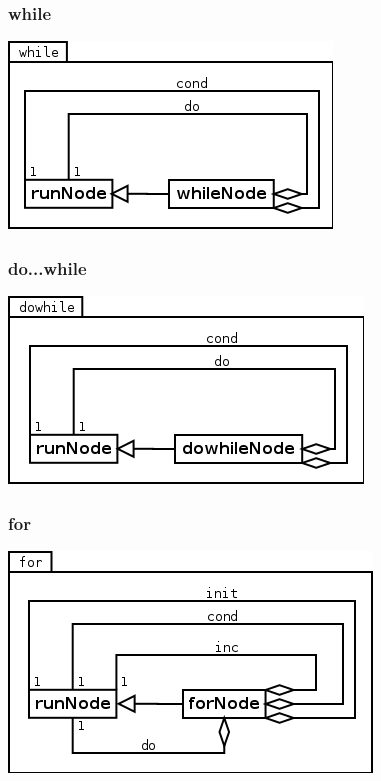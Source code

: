 \subsubsection{while}
\begin{center}
\includegraphics[scale=0.4]{while.png} \\
\end{center}


\subsubsection{do...while}
\begin{center}
\includegraphics[scale=0.4]{dowhile.png} \\
\end{center}

\subsubsection{for}
\begin{center}
\includegraphics[scale=0.4]{for.png} \\
\end{center}

